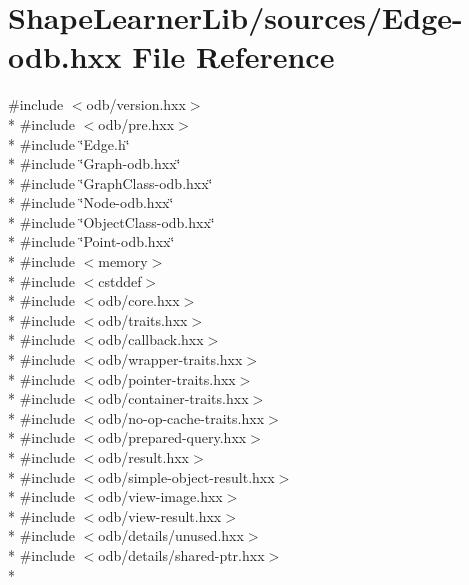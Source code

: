 \hypertarget{_edge-odb_8hxx}{}\section{Shape\+Learner\+Lib/sources/\+Edge-\/odb.hxx File Reference}
\label{_edge-odb_8hxx}
{\ttfamily \#include $<$odb/version.\+hxx$>$}\\*
{\ttfamily \#include $<$odb/pre.\+hxx$>$}\\*
{\ttfamily \#include \char`\"{}Edge.\+h\char`\"{}}\\*
{\ttfamily \#include \char`\"{}Graph-\/odb.\+hxx\char`\"{}}\\*
{\ttfamily \#include \char`\"{}Graph\+Class-\/odb.\+hxx\char`\"{}}\\*
{\ttfamily \#include \char`\"{}Node-\/odb.\+hxx\char`\"{}}\\*
{\ttfamily \#include \char`\"{}Object\+Class-\/odb.\+hxx\char`\"{}}\\*
{\ttfamily \#include \char`\"{}Point-\/odb.\+hxx\char`\"{}}\\*
{\ttfamily \#include $<$memory$>$}\\*
{\ttfamily \#include $<$cstddef$>$}\\*
{\ttfamily \#include $<$odb/core.\+hxx$>$}\\*
{\ttfamily \#include $<$odb/traits.\+hxx$>$}\\*
{\ttfamily \#include $<$odb/callback.\+hxx$>$}\\*
{\ttfamily \#include $<$odb/wrapper-\/traits.\+hxx$>$}\\*
{\ttfamily \#include $<$odb/pointer-\/traits.\+hxx$>$}\\*
{\ttfamily \#include $<$odb/container-\/traits.\+hxx$>$}\\*
{\ttfamily \#include $<$odb/no-\/op-\/cache-\/traits.\+hxx$>$}\\*
{\ttfamily \#include $<$odb/prepared-\/query.\+hxx$>$}\\*
{\ttfamily \#include $<$odb/result.\+hxx$>$}\\*
{\ttfamily \#include $<$odb/simple-\/object-\/result.\+hxx$>$}\\*
{\ttfamily \#include $<$odb/view-\/image.\+hxx$>$}\\*
{\ttfamily \#include $<$odb/view-\/result.\+hxx$>$}\\*
{\ttfamily \#include $<$odb/details/unused.\+hxx$>$}\\*
{\ttfamily \#include $<$odb/details/shared-\/ptr.\+hxx$>$}\\*
